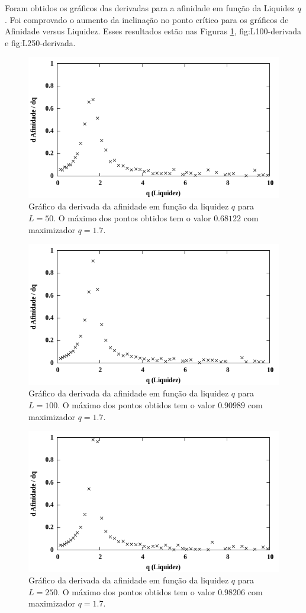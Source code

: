 \documentclass[12pt,a4paper,final]{article}
\begin{document}
  Foram obtidos os gráficos das derivadas para a afinidade em função da Liquidez $q$. Foi comprovado o aumento da inclinação no ponto crítico para os gráficos de Afinidade versus Liquidez. Esses resultados estão nas Figuras \ref{fig:L50-derivada}, {fig:L100-derivada} e {fig:L250-derivada}.

  \begin{figure}[h]
    \centering
    \includegraphics[width=.7\linewidth]{L50-derivada.png}
    \caption{Gráfico da derivada da afinidade em função da liquidez $q$ para $L=50$. O máximo dos pontos obtidos tem o valor $0.68122$ com maximizador $q=1.7$.}
    \label{fig:L50-derivada}
  \end{figure}

  \begin{figure}[h]
    \centering
    \includegraphics[width=.7\linewidth]{L100-derivada.png}
    \caption{Gráfico da derivada da afinidade em função da liquidez $q$ para $L=100$. O máximo dos pontos obtidos tem o valor $0.90989$ com maximizador $q=1.7$.}
    \label{fig:L100-derivada}
  \end{figure}

  \begin{figure}[h]
    \centering
    \includegraphics[width=.7\linewidth]{L250-derivada.png}
    \caption{Gráfico da derivada da afinidade em função da liquidez $q$ para $L=250$. O máximo dos pontos obtidos tem o valor $0.98206$ com maximizador $q=1.7$.}
    \label{fig:L250-derivada}
  \end{figure}
\end{document}
